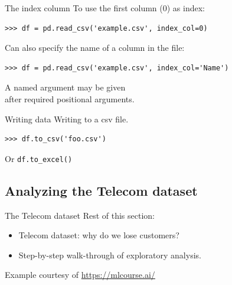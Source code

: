 \documentclass[aspectratio=169,usenames,dvipsnames]{beamer}
\begin{document}
\begin{frame}[fragile]{The index column}
To use the first column (0) as index:
\begin{lstlisting}
>>> df = pd.read_csv('example.csv', index_col=0)
\end{lstlisting}

Can also specify the name of a column in the file:

\begin{lstlisting}
>>> df = pd.read_csv('example.csv', index_col='Name')
\end{lstlisting}

\pause
    \begin{definition}
        A named  argument may be given \\
        after required positional arguments.
    \end{definition}
\end{frame}

\begin{frame}[fragile]{Writing data}
Writing to a csv file.

\begin{lstlisting}
>>> df.to_csv('foo.csv')
\end{lstlisting}
Or \texttt{df.to\_excel()}
\end{frame}



\subsection{Analyzing the Telecom dataset}
\begin{frame}{The Telecom dataset}
    Rest of this section:
    \begin{itemize}
        \item Telecom dataset: why do we lose customers?
        \item Step-by-step walk-through of exploratory analysis.
    \end{itemize}

    \vspace{1em}
    Example courtesy of \url{https://mlcourse.ai/}
\end{frame}
\end{document}
